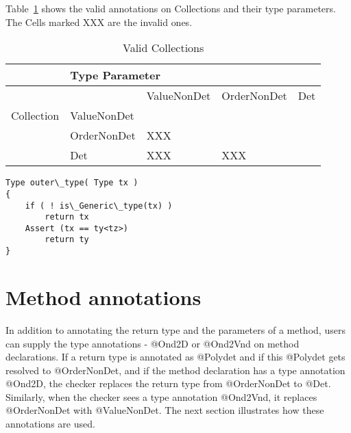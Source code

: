 Table~\ref{Tab:validity} shows the valid annotations on Collections and their type parameters.
The Cells marked XXX are the invalid ones.
\begin{table}[h]
	\centering
	\caption{Valid Collections}
	\label{Tab:validity}
	\begin{tabular}{|l|l|l|l|l|}
		\hline
		& 		\multicolumn{4}{l|}{Type Parameter}		                                                                   \\ \hline
		&             & ValueNonDet                                     & OrderNonDet              & Det \\ \cline{2-5}
		Collection    & ValueNonDet &                                                 &                          &     \\ \cline{2-5}
		& OrderNonDet &   XXX  &                          &     \\ \cline{2-5}
		& Det         &         XXX               &  	XXX	&     \\ \hline
	\end{tabular}
\end{table}



\begin{verbatim}
Type outer\_type( Type tx )
{
    if ( ! is\_Generic\_type(tx) )
        return tx
    Assert (tx == ty<tz>)
        return ty
}
\end{verbatim}

\section{Method annotations\label{method-annotations}}
In addition to annotating the return type and the parameters of a method, users can supply the type annotations -
@Ond2D or @Ond2Vnd on method declarations.
If a return type is annotated as @Polydet and if this @Polydet gets resolved to @OrderNonDet, and if the method declaration has a type annotation @Ond2D,
the checker replaces the return type from @OrderNonDet to @Det. Similarly, when the checker sees a type annotation @Ond2Vnd, it
replaces @OrderNonDet with @ValueNonDet. The next section illustrates how these annotations are used.

